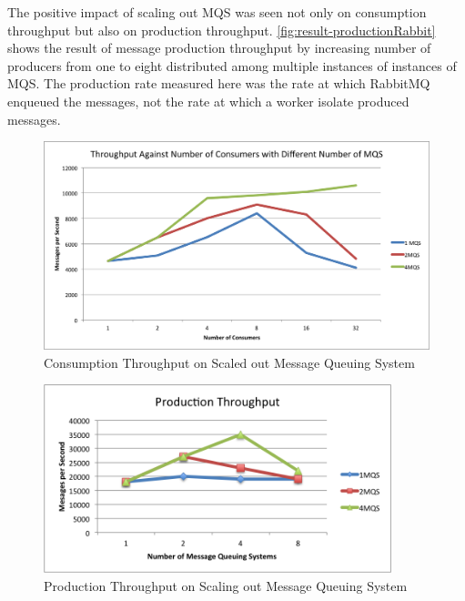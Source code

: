   The positive impact of scaling out MQS was seen not only on consumption throughput but also on production throughput. \autoref{fig:result-productionRabbit} shows the result of message production throughput by increasing number of producers from one to eight distributed among multiple instances of instances of MQS. The production rate measured here was the rate at which RabbitMQ enqueued the messages, not the rate at which a worker isolate produced messages.
\begin{figure}[H]
  \centering
  \includegraphics[width=1\textwidth]{figures/04varyingMqs}
  \caption[Consumption Throughput on Scaled out Message Queuing System]{Consumption Throughput on Scaled out Message Queuing System}
  \label{fig:result-varyingMqs}
\end{figure}


\begin{figure}[H]
  \centering  \includegraphics[width=0.9\textwidth]{figures/05productionRabbit}
  \caption[Production Throughput on Scaling out Message Queuing System]{Production Throughput on Scaling out Message Queuing System}
  \label{fig:result-productionRabbit}
\end{figure}


